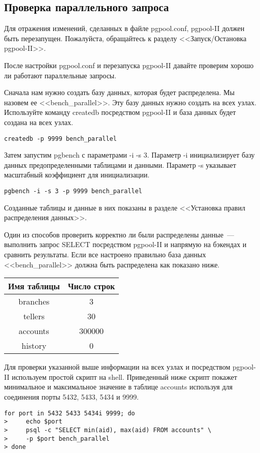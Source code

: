 \subsection{Проверка параллельного запроса}
Для отражения изменений, сделанных в файле pgpool.conf, pgpool-II должен быть перезапущен. 
Пожалуйста, обращайтесь к разделу <<Запуск/Остановка pgpool-II>>.

После настройки pgpool.conf и перезапуска pgpool-II давайте проверим хорошо ли работают параллельные запросы.

Сначала нам нужно создать базу данных, которая будет распределена. Мы назовем ее <<bench\_parallel>>. 
Эту базу данных нужно создать на всех узлах. Используйте команду createdb посредством pgpool-II и база 
данных будет создана на всех узлах.
\begin{lstlisting}[label=lst:pgpool37,caption=Проверка параллельного запроса]
createdb -p 9999 bench_parallel
\end{lstlisting}

Затем запустим pgbench с параметрами -i -s 3. Параметр -i инициализирует базу данных предопределенными 
таблицами и данными. Параметр -s указывает масштабный коэффициент для инициализации.
\begin{lstlisting}[label=lst:pgpool38,caption=Проверка параллельного запроса]
pgbench -i -s 3 -p 9999 bench_parallel
\end{lstlisting}

Созданные таблицы и данные в них показаны в разделе <<Установка правил распределения данных>>.

Один из способов проверить корректно ли были распределены данные~--- выполнить запрос SELECT посредством 
pgpool-II и напрямую на бэкендах и сравнить результаты. Если все настроено правильно база данных 
<<bench\_parallel>> должна быть распределена как показано ниже.

\begin{tabular}{ | c | c | }
  \hline
  Имя таблицы & Число строк \\
  \hline
  branches & 3 \\
  \hline
  tellers & 30 \\
  \hline
  accounts & 300000 \\
  \hline
  history & 0 \\
  \hline
\end{tabular}

Для проверки указанной выше информации на всех узлах и посредством pgpool-II используем простой скрипт на shell. 
Приведенный ниже скрипт покажет минимальное и максимальное значение в таблице accounts используя для соединения 
порты 5432, 5433, 5434 и 9999.
\begin{lstlisting}[label=lst:pgpool39,caption=Проверка параллельного запроса]
for port in 5432 5433 5434i 9999; do
>     echo $port
>     psql -c "SELECT min(aid), max(aid) FROM accounts" \
>     -p $port bench_parallel
> done
\end{lstlisting}


